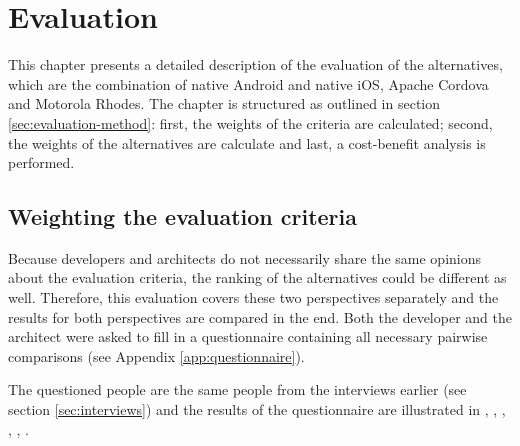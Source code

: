\chapter{Evaluation}
\label{chap:evaluation}

This chapter presents a detailed description of the evaluation of the alternatives, which are the combination of native Android and native iOS, Apache Cordova and Motorola Rhodes. The chapter is structured as outlined in section \ref{sec:evaluation-method}: first, the weights of the criteria are calculated; second, the weights of the alternatives are calculate and last, a cost-benefit analysis is performed.

\section{Weighting the evaluation criteria}

Because developers and architects do not necessarily share the same opinions about the evaluation criteria, the ranking of the alternatives could be different as well. Therefore, this evaluation covers these two perspectives separately and the results for both perspectives are compared in the end. Both the developer and the architect were asked to fill in a questionnaire containing all necessary pairwise comparisons (see Appendix \ref{app:questionnaire}). 

The questioned people are the same people from the interviews earlier (see section \ref{sec:interviews}) and the results of the questionnaire are illustrated in , , , , , .

